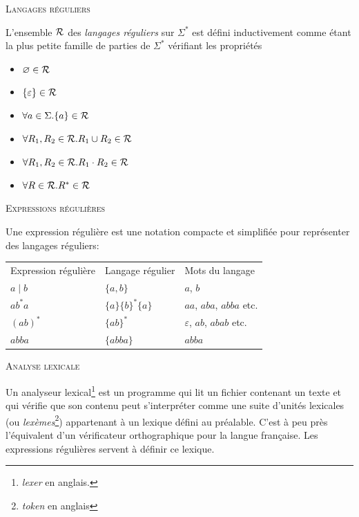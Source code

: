 \documentclass[11pt,a4paper]{article}
\newcommand{\R}{{\cal R}}
\begin{document}
\noindent
\textsc{Langages réguliers}

L'ensemble $\R$ des \emph{langages réguliers} sur $\Sigma^{*}$ est
défini inductivement comme étant la plus petite famille de parties de
$\Sigma^{*}$ vérifiant les propriétés

\begin{itemize}

  \item $\varnothing \in \R$

  \item $\{\varepsilon\} \in \R$

  \item $\forall a \in \Sigma.\{a\} \in \R$

  \item $\forall R_1, R_2 \in \R.R_1 \cup R_2 \in \R$

  \item $\forall R_1, R_2 \in \R.R_1 \cdot R_2 \in \R$

  \item $\forall R \in \R.R^{*} \in \R$

\end{itemize}

\noindent
\textsc{Expressions régulières}

Une expression régulière est une notation compacte et simplifiée pour
représenter des langages réguliers:

\begin{center}
\begin{tabular}{lll}
    Expression régulière
  & Langage régulier
  & Mots du langage\\
    $a \mid b$
  & $\{a, b\}$
  & $a$, $b$\\
    $ab^{*}a$
  & $\{a\}\{b\}^{*}\{a\}$
  & $aa$, $aba$, $abba$ etc.\\
    $(ab)^{*}$
  & $\{ab\}^{*}$
  & $\varepsilon$, $ab$, $abab$ etc.\\
    $abba$
  & $\{abba\}$
  & $abba$
\end{tabular}
\end{center}

\noindent
\textsc{Analyse lexicale}

Un analyseur lexical\footnote{\emph{lexer} en anglais.} est un
programme qui lit un fichier contenant un texte et qui vérifie que son
contenu peut s'interpréter comme une suite d'unités lexicales (ou
\emph{lexèmes}\footnote{\emph{token} en anglais}) appartenant à un
lexique défini au préalable. C'est à peu près l'équivalent d'un
vérificateur orthographique pour la langue française. Les expressions
régulières servent à définir ce lexique.
\end{document}
